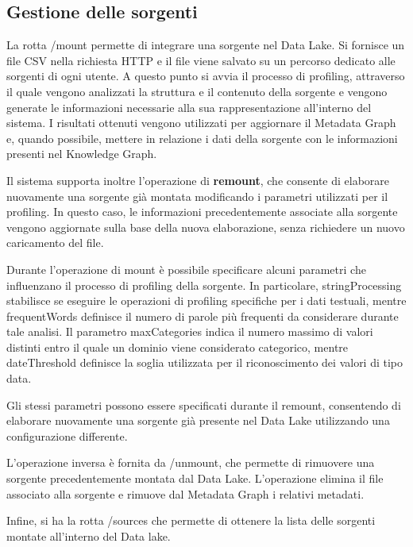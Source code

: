 \documentclass[13.6pt,a4paper]{report}
\begin{document}
\noindent

\subsection{Gestione delle sorgenti}


La rotta \colorbox{gray!15}{/mount} permette di integrare una sorgente nel Data Lake. Si fornisce un file CSV nella richiesta HTTP e il file viene salvato su un percorso dedicato alle sorgenti di ogni utente. A questo punto si avvia il processo di profiling, attraverso il quale vengono analizzati la struttura e il contenuto della sorgente e vengono generate le informazioni necessarie alla sua rappresentazione all'interno del sistema. I risultati ottenuti vengono utilizzati per aggiornare il Metadata Graph e, quando possibile, mettere in relazione i dati della sorgente con le informazioni presenti nel Knowledge Graph.

\noindent
Il sistema supporta inoltre l'operazione di \textbf{remount}, che consente di elaborare nuovamente una sorgente già montata modificando i parametri utilizzati per il profiling. In questo caso, le informazioni precedentemente associate alla sorgente vengono aggiornate sulla base della nuova elaborazione, senza richiedere un nuovo caricamento del file.

\noindent
Durante l'operazione di mount è possibile specificare alcuni parametri che influenzano il processo di profiling della sorgente. In particolare, stringProcessing stabilisce se eseguire le operazioni di profiling specifiche per i dati testuali, mentre frequentWords definisce il numero di parole più frequenti da considerare durante tale analisi. Il parametro maxCategories indica il numero massimo di valori distinti entro il quale un dominio viene considerato categorico, mentre dateThreshold definisce la soglia utilizzata per il riconoscimento dei valori di tipo data.

\noindent
Gli stessi parametri possono essere specificati durante il remount, consentendo di elaborare nuovamente una sorgente già presente nel Data Lake utilizzando una configurazione differente.

\noindent
L'operazione inversa è fornita da  \colorbox{gray!15}{/unmount}, che permette di rimuovere una sorgente precedentemente montata dal Data Lake. L’operazione elimina il file associato alla sorgente e rimuove dal Metadata Graph i relativi metadati.

\noindent
Infine, si ha la rotta \colorbox{gray!15}{/sources} che permette di ottenere la lista delle sorgenti montate all'interno del Data lake.
\end{document}
